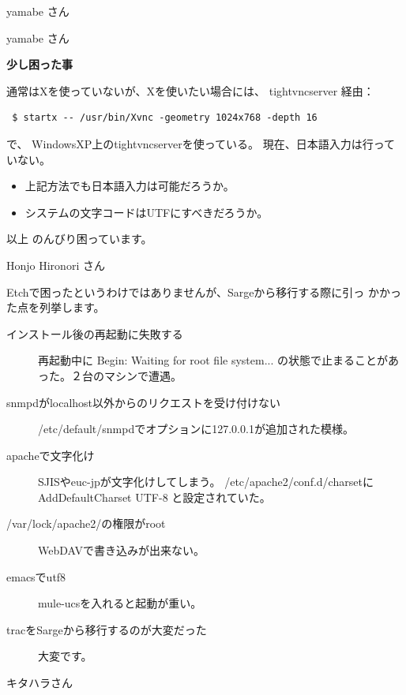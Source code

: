 \documentclass[cjk,dvipdfmx,12pt]{beamer}
\begin{document}
\begin{frame}[containsverbatim]{yamabe さん}
\end{frame}\begin{frame}[containsverbatim]{yamabe さん}

\textbf{少し困った事}

通常はXを使っていないが、Xを使いたい場合には、
tightvncserver 経由：

\begin{verbatim}
 $ startx -- /usr/bin/Xvnc -geometry 1024x768 -depth 16
\end{verbatim}

で、
WindowsXP上のtightvncserverを使っている。
現在、日本語入力は行っていない。
\begin{itemize}
\item 上記方法でも日本語入力は可能だろうか。
\item システムの文字コードはUTFにすべきだろうか。
\end{itemize}

以上 のんびり困っています。

\end{frame}\begin{frame}{Honjo Hironori さん}

Etchで困ったというわけではありませんが、Sargeから移行する際に引っ
かかった点を列挙します。

\begin{description}
 \item[インストール後の再起動に失敗する]
 再起動中に
 Begin: Waiting for root file system...
 の状態で止まることがあった。２台のマシンで遭遇。

 \item[snmpdがlocalhost以外からのリクエストを受け付けない]
 /etc/default/snmpdでオプションに127.0.0.1が追加された模様。

 \item[apacheで文字化け]
 SJISやeuc-jpが文字化けしてしまう。
 /etc/apache2/conf.d/charsetに
 AddDefaultCharset UTF-8
 と設定されていた。

 \item[/var/lock/apache2/の権限がroot]
 WebDAVで書き込みが出来ない。

 \item[emacsでutf8]
 mule-ucsを入れると起動が重い。

 \item[tracをSargeから移行するのが大変だった]
 大変です。
\end{description}

\end{frame}\begin{frame}{キタハラさん}


\end{frame}
\end{document}
